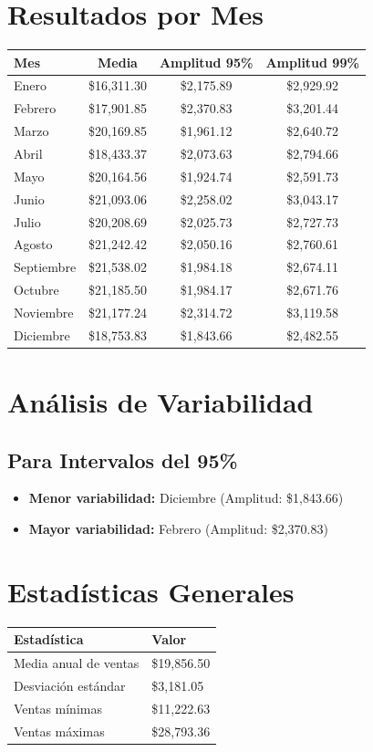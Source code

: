 \section*{Resultados por Mes}

\begin{tabular}{@{}lccc@{}}
\toprule
\textbf{Mes} & \textbf{Media} & \textbf{Amplitud 95\%} & \textbf{Amplitud 99\%} \\
\midrule
Enero        & \$16,311.30 & \$2,175.89 & \$2,929.92 \\
Febrero      & \$17,901.85 & \$2,370.83 & \$3,201.44 \\
Marzo        & \$20,169.85 & \$1,961.12 & \$2,640.72 \\
Abril        & \$18,433.37 & \$2,073.63 & \$2,794.66 \\
Mayo         & \$20,164.56 & \$1,924.74 & \$2,591.73 \\
Junio        & \$21,093.06 & \$2,258.02 & \$3,043.17 \\
Julio        & \$20,208.69 & \$2,025.73 & \$2,727.73 \\
Agosto       & \$21,242.42 & \$2,050.16 & \$2,760.61 \\
Septiembre   & \$21,538.02 & \$1,984.18 & \$2,674.11 \\
Octubre      & \$21,185.50 & \$1,984.17 & \$2,671.76 \\
Noviembre    & \$21,177.24 & \$2,314.72 & \$3,119.58 \\
Diciembre    & \$18,753.83 & \$1,843.66 & \$2,482.55 \\
\bottomrule
\end{tabular}

\section*{An\'alisis de Variabilidad}

\subsection*{Para Intervalos del 95\%}
\begin{itemize}
    \item \textbf{Menor variabilidad:} Diciembre (Amplitud: \$1,843.66)
    \item \textbf{Mayor variabilidad:} Febrero (Amplitud: \$2,370.83)
\end{itemize}




\section*{Estadísticas Generales}
\begin{tabular}{@{}ll@{}}
\toprule
\textbf{Estadística}         & \textbf{Valor}         \\
\midrule
Media anual de ventas & \$19,856.50 \\
Desviación estándar   & \$3,181.05 \\
Ventas mínimas        & \$11,222.63 \\
Ventas máximas        & \$28,793.36 \\
\bottomrule
\end{tabular}




